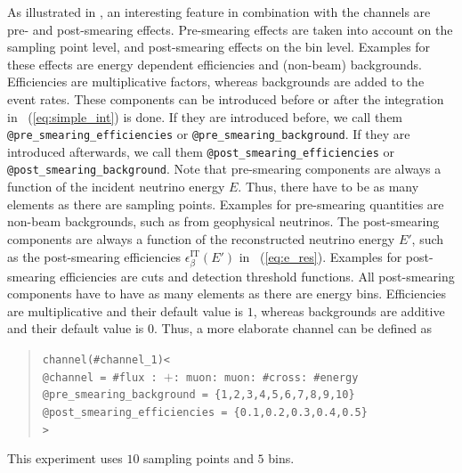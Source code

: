 As illustrated in , an interesting feature in combination with the
channels are pre- and post-smearing effects. Pre-smearing effects are taken into account on the sampling point level, and post-smearing effects on the bin level. Examples for these effects are energy 
dependent efficiencies and (non-beam) backgrounds. Efficiencies are multiplicative factors, whereas backgrounds are added to the event rates. These components can be introduced before or after the integration in \eq~(\ref{eq:simple_int}) is done. 
%
%
%
%
%
%
If they are introduced before, 
we call them
{\tt @pre\_smearing\_efficiencies} or {\tt @pre\_smearing\_background}. 
If they are introduced afterwards, we call them {\tt @post\_smearing\_efficiencies} or {\tt @post\_smearing\_background}.
Note that pre-smearing components are always a function of the incident neutrino energy $E$. Thus, there have to be as  many elements as there are sampling points. 
Examples for pre-smearing quantities are non-beam backgrounds, such as from geophysical neutrinos. The post-smearing components are always a function of the reconstructed neutrino energy $E'$, such as the post-smearing efficiencies $\epsilon_\beta^{\text{IT}}(E')$ in \eq~(\ref{eq:e_res}). Examples for post-smearing efficiencies are cuts and detection threshold functions. All post-smearing components have to have as 
many elements as there are energy bins. Efficiencies are multiplicative 
and their default value is $1$, whereas backgrounds are additive and their default value is $0$. Thus, a more elaborate channel can be defined as
\begin{quote}
{\tt channel(\#channel\_1)<\\
\tb @channel = \#flux : $+$: muon: muon: \#cross: \#energy\\
\tb @pre\_smearing\_background = \{1,2,3,4,5,6,7,8,9,10\}\\
\tb @post\_smearing\_efficiencies = \{0.1,0.2,0.3,0.4,0.5\}\\
>}
\end{quote}
%
%
This experiment uses $10$ sampling points and $5$ bins.

